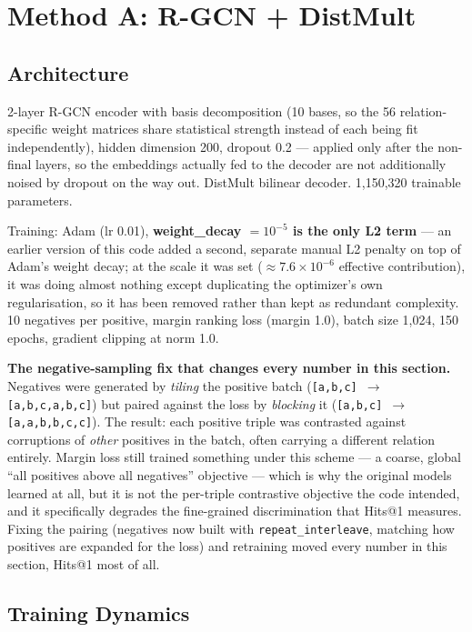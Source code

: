 \documentclass[11pt,a4paper]{article}
\newcommand{\rel}[1]{\texttt{\small #1}}
\begin{document}
\section{Method A: R-GCN + DistMult}

\subsection{Architecture}

2-layer R-GCN encoder with basis decomposition (10 bases, so the 56
relation-specific weight matrices share statistical strength instead of
each being fit independently), hidden dimension 200, dropout 0.2 ---
applied only after the non-final layers, so the embeddings actually fed
to the decoder are not additionally noised by dropout on the way out.
DistMult bilinear decoder. 1{,}150{,}320 trainable parameters.

Training: Adam (lr 0.01), \textbf{weight\_decay $=10^{-5}$ is the only L2
term} --- an earlier version of this code added a second, separate
manual L2 penalty on top of Adam's weight decay; at the scale it was set
($\approx 7.6\times 10^{-6}$ effective contribution), it was doing almost
nothing except duplicating the optimizer's own regularisation, so it has
been removed rather than kept as redundant complexity. 10 negatives per
positive, margin ranking loss (margin 1.0), batch size 1{,}024, 150
epochs, gradient clipping at norm 1.0.

\begin{why}
\textbf{The negative-sampling fix that changes every number in this
section.} Negatives were generated by \emph{tiling} the positive batch
(\rel{[a,b,c] $\to$ [a,b,c,a,b,c]}) but paired against the loss by
\emph{blocking} it (\rel{[a,b,c] $\to$ [a,a,b,b,c,c]}). The result: each
positive triple was contrasted against corruptions of \emph{other}
positives in the batch, often carrying a different relation entirely.
Margin loss still trained something under this scheme --- a coarse,
global ``all positives above all negatives'' objective --- which is why
the original models learned at all, but it is not the per-triple
contrastive objective the code intended, and it specifically degrades the
fine-grained discrimination that Hits@1 measures. Fixing the pairing
(negatives now built with \texttt{repeat\_interleave}, matching how
positives are expanded for the loss) and retraining moved every number in
this section, Hits@1 most of all.
\end{why}

\subsection{Training Dynamics}
\end{document}
